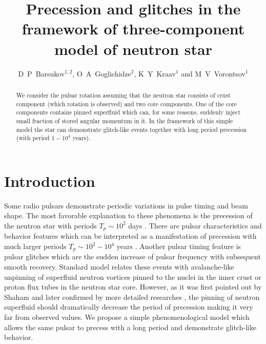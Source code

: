 \documentclass[a4paper]{jpconf}
\begin{document}
  \title{Precession and glitches in the framework of three-component model of neutron star}
  \author{
  D~P~Barsukov$^{1,2}$,  
  O~A~Goglichidze$^{2}$,
  K~Y~Kraav$^{1}$ and 
  M~V~Vorontsov$^{1}$
  }
  \address{
    $^{1}$ Peter the Great St. Petersburg Polytechnic University, 195251, Saint~Petersburg, Russian~Federation
    \\  
    $^{2}$ Ioffe Institute,  194021, Saint~Petersburg, Russian~Federation
  }
  \begin{abstract} 
    We consider the pulsar rotation assuming that the neutron star consists of crust component (which rotation is observed) and two core components. 
    One of the core components contains pinned superfluid which can, for some reasons, suddenly inject small fraction of stored angular momentum in it. In the framework of this simple model the star can demonstrate glitch-like events together with long period precession (with period $1-10^{4}$ years). 
  \end{abstract}
  
  
  
  
  
  
  
  \section{Introduction}     
    Some radio pulsars demonstrate periodic variations in pulse timing and beam shape.
    The most favorable explanation to these phenomena is the precession of the neutron star with periods $T_p \sim 10^2$ days \cite{AshtonJonesPrix2016,KerrHobbsJohnstonShannon2016}. %
    There are pulsar characteristics and behavior features which can be interpreted as a manifestation of precession with much larger periods $T_p\sim10^2-10^4$ years \cite{ArzamasskiyEtAl2015,BiryukovBeskinKarpov2012}.
    Another 
    pulsar timing feature 
    is pulsar glitches which are the sudden 
    increase of pulsar frequency
    with subsequent smooth recovery.
    Standard model relates these events with avalanche-like unpinning of superfluid neutron vortices pinned to the nuclei in the inner crust or proton flux tubes in the neutron star core. However, as it was first pointed out by Shaham \cite{Shaham1977} and later confirmed by more detailed researches \cite{SedrakianWassermanCordes1999,Link2006}, the pinning of neutron superfluid should dramatically decrease the period of precession making it very far from observed values. 
    We propose a simple phenomenological model which allows the same pulsar to precess with a long period and demonstrate glitch-like 
    behavior.
    
\end{document}
